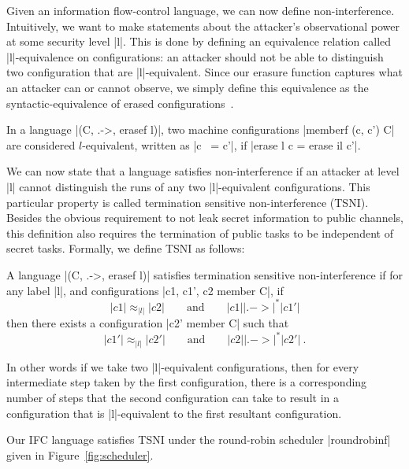 Given an information flow-control language, we can now define non-interference.
Intuitively, we want to make statements about the attacker's observational
power at some security level |l|.  This is done by defining an equivalence
relation called |l|-equivalence on configurations: an attacker should
not be able to distinguish two configuration that are |l|-equivalent.
%
Since our erasure function captures what an attacker can or cannot observe, we simply define this
equivalence as the syntactic-equivalence of erased configurations~\cite{stefan:addressing-covert}.
%
\begin{definition}[|l|-equivalence]
    In a language |(C, .->, erasef l)|, two machine configurations
    |memberf (c, c') C| are considered $l$-equivalent, written as |c ~= c'|,
    if |erase l c = erase il c'|.
\end{definition}
%

We can now state that a language satisfies non-interference if an
attacker at level |l| cannot distinguish the runs of any two |l|-equivalent
configurations.
%
This particular property is called termination sensitive non-interference
(TSNI).  Besides the obvious requirement to not leak secret information
to public channels, this definition also requires the termination
of public tasks to be independent of secret tasks.
%
Formally, we define TSNI as follows:

\begin{definition}
  A language |(C, .->, erasef l)| satisfies termination
  sensitive non-interference if for any label |l|, and configurations
  |c1, c1', c2 member C|, if
  \begin{equation} \label{eq:tsni-lhs}
    |c1| \approx_{|l|} |c2|
    \qquad \text{and} \qquad
    |c1| |.->|^* |c1'|
  \end{equation}
  then there exists a configuration |c2' member C| such that
  \begin{equation} \label{eq:tsni-rhs}
    |c1'| \approx_{|l|} |c2'|
     \qquad \text{and} \qquad
    |c2| |.->|^* |c2'|
    \ \text{.}
  \end{equation}
\end{definition}
%
In other words if we take two |l|-equivalent configurations, then for every
intermediate step taken by the first configuration, there is a corresponding
number of steps that the second configuration can take to result in a
configuration that is |l|-equivalent to the first resultant configuration.


Our IFC language satisfies TSNI %
%
under the round-robin scheduler
|roundrobinf| given in Figure~\ref{fig:scheduler}.


